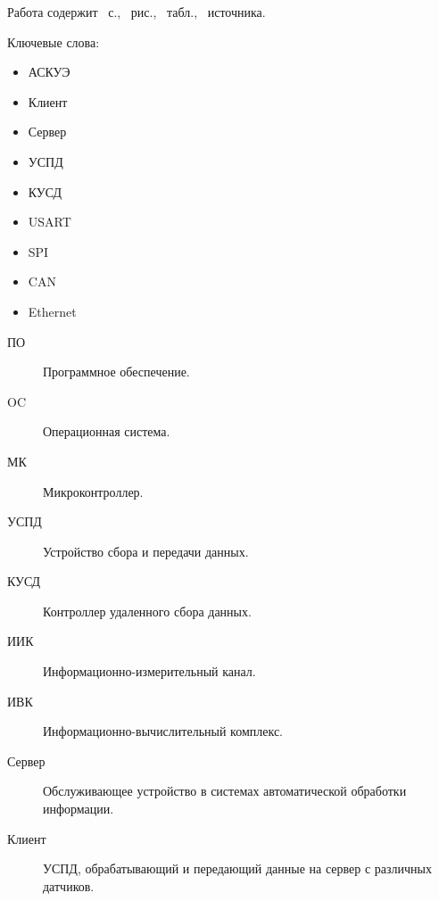 \documentclass[utf8x,14pt, coursreport]{G7-32}
\begin{document}

\frontmatter %



\Referat %

Работа содержит \totalpages{}~с., \totalfigures{}~рис., \totaltables{}~табл., \totalbibs{}~источника.

Ключевые слова:
\begin{itemize}
\item АСКУЭ
\item Клиент
\item Сервер
\item УСПД
\item КУСД
\item USART
\item SPI
\item CAN
\item Ethernet
\end{itemize}

\tableofcontents

\Abbreviations

\begin{description}
\item[ПО] Программное обеспечение.
\item[OC] Операционная система.
\item[МК] Микроконтроллер.
\item[УСПД] Устройство сбора и передачи данных.
\item[КУСД] Контроллер удаленного сбора данных.
\item[ИИК] Информационно-измерительный канал.
\item[ИВК] Информационно-вычислительный комплекс.
\item[Сервер] Обслуживающее устройство в системах автоматической обработки информации.
\item[Клиент] УСПД, обрабатывающий и передающий данные на сервер с различных датчиков.
\end{description}
\end{document}

